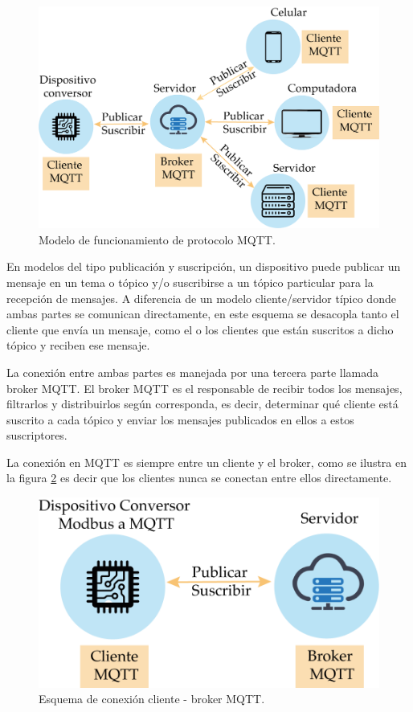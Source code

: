 \begin{figure}[htpb]
	\centering
	\includegraphics[scale=.7]{./Figures/mqtt-protocol.png}
	\caption[Esquema de funcionamiento MQTT ]{Modelo de funcionamiento de protocolo MQTT.}
	\label{fig:mqtt-esquema}
\end{figure}

En modelos del tipo publicación y suscripción, un dispositivo puede publicar un mensaje en un tema o tópico y/o suscribirse a un tópico particular para la recepción de mensajes.  A diferencia de un modelo cliente/servidor típico donde ambas partes se comunican directamente, en este esquema se desacopla tanto el cliente que envía un mensaje, como el o los clientes que están suscritos a dicho tópico y reciben ese mensaje. 

La conexión entre ambas partes es manejada por una tercera parte llamada broker MQTT.  El broker MQTT es el responsable de recibir todos los mensajes, filtrarlos y distribuirlos según corresponda, es decir, determinar qué cliente está suscrito a cada tópico y enviar los mensajes publicados en ellos a estos suscriptores.

La conexión en MQTT es siempre entre un cliente y el broker, como se ilustra en la figura \ref{fig:mqtt-cliente-broker} es decir que los clientes nunca se conectan entre ellos directamente.

\begin{figure}[htpb]
	\centering
	\includegraphics[scale=.7]{./Figures/cliente-broker.png}
	\caption{Esquema de conexión cliente - broker MQTT.}
	\label{fig:mqtt-cliente-broker}
\end{figure}

